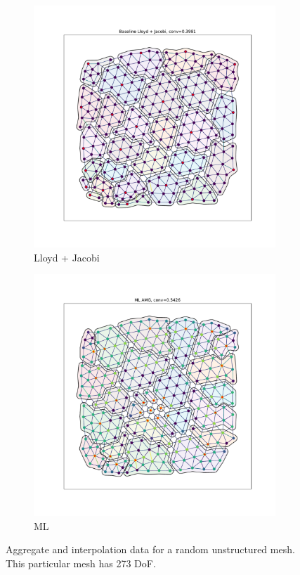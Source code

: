 \documentclass{article}
\begin{document}
\begin{figure}[h]
  \centering
  \begin{subfigure}[t]{0.49\textwidth}
    \centering
    \includegraphics[width=\textwidth, trim=80 70 70 50, clip]{grid_800_lloyd.pdf}
    \caption{Lloyd + Jacobi}
  \end{subfigure}
  \begin{subfigure}[t]{0.49\textwidth}
    \centering
    \includegraphics[width=\textwidth, trim=80 70 70 50, clip]{grid_800_ml.pdf}
    \caption{ML}
  \end{subfigure}
  \caption{Aggregate and interpolation data for a random unstructured mesh.  This particular mesh has 273 DoF.}
  \label{fig:grid800}
\end{figure}
\end{document}
